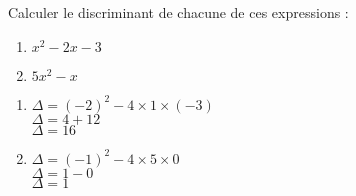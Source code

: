 \documentclass[a4paper,11pt,exos]{nsi} %
\begin{document}

\maketitle

\begin{exercice}
    Calculer le discriminant de chacune de ces expressions :
    \begin{multicols}{2}
        \begin{enumerate}
            \item $x^2-2x-3$
        
            \item $5x^2-x$
        \end{enumerate}
    \end{multicols}
    
    \end{exercice}

    \begin{multicols}{2}
        \begin{enumerate}
            \item$\Delta = (-2)^2-4\times1\times(-3)$\\
                $\Delta = 4+12$\\
                $\Delta=16$
        
            \item $\Delta = (-1)^2-4\times5\times0$\\
            $\Delta=1-0$\\
            $\Delta=1$
        \end{enumerate}
    \end{multicols}
\end{document}
